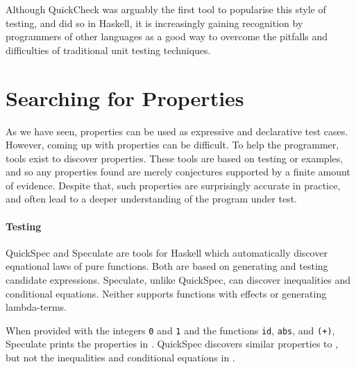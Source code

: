 Although QuickCheck was arguably the first tool to popularise this style of
testing, and did so in Haskell, it is increasingly gaining recognition by
programmers of other languages as a good way to overcome the pitfalls and
difficulties of traditional unit testing techniques.

\section{Searching for Properties}
\label{sec:property_testing-gen}

As we have seen, properties can be used as expressive and declarative
test cases.  However, coming up with properties can be difficult.  To
help the programmer, tools exist to discover properties.  These tools
are based on testing or examples, and so any properties found are
merely conjectures supported by a finite amount of evidence.  Despite
that, such properties are surprisingly accurate in practice, and often
lead to a deeper understanding of the program under test.

\paragraph{Testing}
QuickSpec\cite{claessen2010,smallbone2017} and
Speculate\cite{braquehais2017} are tools for Haskell which
automatically discover equational laws of pure functions.  Both are
based on generating and testing candidate expressions.  Speculate,
unlike QuickSpec, can discover inequalities and conditional equations.
Neither supports functions with effects or generating lambda-terms.

When provided with the integers \verb|0| and \verb|1| and the
functions \verb|id|, \verb|abs|, and \verb|(+)|, Speculate prints the
properties in .  QuickSpec discovers similar
properties to , but not the inequalities and
conditional equations in .

